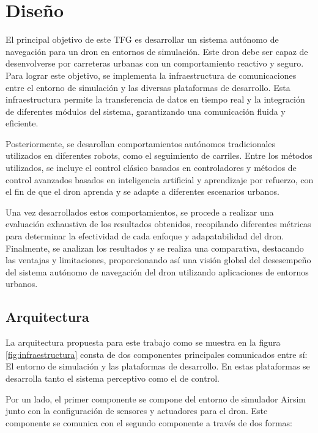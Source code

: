 \chapter{Diseño}
\label{cap:capitulo4}


\vspace{1cm}
El principal objetivo de este TFG es desarrollar un sistema autónomo de navegación para un dron en entornos de simulación. Este dron debe ser capaz de desenvolverse
por carreteras urbanas con un comportamiento reactivo y seguro. 
Para lograr este objetivo, se implementa la infraestructura de comunicaciones entre el entorno de simulación y las diversas 
plataformas de desarrollo. Esta infraestructura permite la transferencia de datos en tiempo real y la integración de diferentes módulos del sistema, garantizando 
una comunicación fluida y eficiente.

Posteriormente, se desarollan comportamientos autónomos tradicionales utilizados en diferentes robots, como el seguimiento de carriles. Entre los métodos utilizados, se incluye 
el control clásico basados en controladores y métodos de control avanzados basados en inteligencia artificial y aprendizaje por refuerzo, con el fin de que el dron aprenda y se 
adapte a diferentes escenarios urbanos. 

Una vez desarrollados estos comportamientos, se procede a realizar una evaluación exhaustiva de los resultados obtenidos, 
recopilando diferentes métricas para determinar la efectividad de cada enfoque y adapatabilidad del dron. 
Finalmente, se analizan los resultados y se realiza una comparativa, destacando las ventajas y limitaciones, proporcionando así una visión global del desesempeño del sistema autónomo 
de navegación del dron utilizando aplicaciones de entornos urbanos. 


\section{Arquitectura}
\label{sec:Arquitectura}

La arquitectura propuesta para este trabajo como se muestra en la figura \ref{fig:infraestructura} consta de dos componentes principales 
comunicados entre sí: El entorno de simulación y las plataformas de desarrollo. En estas plataformas se desarrolla tanto el sistema perceptivo 
como el de control.

Por un lado, el primer componente se compone del entorno de simulador Airsim junto con la configuración de sensores y actuadores para el dron. Este componente 
se comunica con el segundo componente a través de dos formas: 

